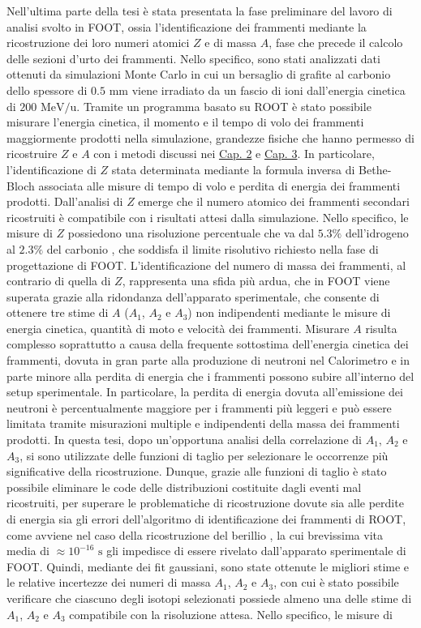 \documentclass[12pt,a4paper,twoside]{report}
\begin{document}
	Nell'ultima parte della tesi è stata presentata la fase preliminare del lavoro di analisi svolto in FOOT, ossia l'identificazione dei frammenti mediante la ricostruzione dei loro numeri atomici $Z$ e di massa $A$, fase che precede il calcolo delle sezioni d'urto dei frammenti. Nello specifico, sono stati analizzati dati ottenuti da simulazioni Monte Carlo in cui un bersaglio di grafite al carbonio  dello spessore di $0.5 \mbox{ mm}$ viene irradiato da un fascio di ioni  dall'energia cinetica di $200 \mbox{ MeV/u}$. Tramite un programma basato su ROOT è stato possibile misurare l'energia cinetica, il momento e il tempo di volo dei frammenti maggiormente prodotti nella simulazione, grandezze fisiche che hanno permesso di ricostruire $Z$ e $A$ con i metodi discussi nei \hyperref[cap:2]{Cap. 2} e \hyperref[cap:3]{Cap. 3}. In particolare, l'identificazione di $Z$ stata determinata mediante la formula inversa di Bethe-Bloch associata alle misure di tempo di volo e perdita di energia dei frammenti prodotti. Dall'analisi di $Z$ emerge che il numero atomico dei frammenti secondari ricostruiti è compatibile con i risultati attesi dalla simulazione. Nello specifico, le misure di $Z$ possiedono una risoluzione percentuale che va dal $5.3\%$ dell'idrogeno  al $2.3\%$ del carbonio , che soddisfa il limite risolutivo richiesto nella fase di progettazione di FOOT. L'identificazione del numero di massa dei frammenti, al contrario di quella di $Z$, rappresenta una sfida più ardua, che in FOOT viene superata grazie alla ridondanza dell'apparato sperimentale, che consente di ottenere tre stime di $A$ ($A_1$, $A_2$ e $A_3$) non indipendenti mediante le misure di energia cinetica, quantità di moto e velocità dei frammenti. Misurare $A$ risulta complesso soprattutto a causa della frequente sottostima dell'energia cinetica dei frammenti, dovuta in gran parte alla produzione di neutroni nel Calorimetro e in parte minore alla perdita di energia che i frammenti possono subire all'interno del setup sperimentale. In particolare, la perdita di energia dovuta all'emissione dei neutroni è percentualmente maggiore per i frammenti più leggeri e può essere limitata tramite misurazioni multiple e indipendenti della massa dei frammenti prodotti. In questa tesi, dopo un'opportuna analisi della correlazione di $A_1$, $A_2$ e $A_3$, si sono utilizzate delle funzioni di taglio per selezionare le occorrenze più significative della ricostruzione. Dunque, grazie alle funzioni di taglio è stato possibile eliminare le code delle distribuzioni costituite dagli eventi mal ricostruiti, per superare le problematiche di ricostruzione dovute sia alle perdite di energia sia gli errori dell'algoritmo di identificazione dei frammenti di ROOT, come avviene nel caso della ricostruzione del berillio , la cui brevissima vita media di $\approx10^{-16}\mbox{ s}$ gli impedisce di essere rivelato dall'apparato sperimentale di FOOT. Quindi, mediante dei fit gaussiani, sono state ottenute le migliori stime e le relative incertezze dei numeri di massa $A_1$, $A_2$ e $A_3$, con cui è stato possibile verificare che ciascuno degli isotopi selezionati possiede almeno una delle stime di $A_1$, $A_2$ e $A_3$ compatibile con la risoluzione attesa. Nello specifico, le misure di 
\end{document}
